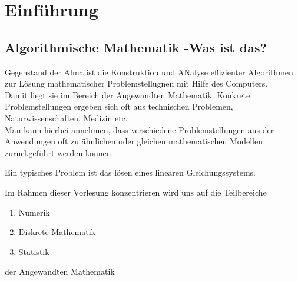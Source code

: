 \section{Einführung}
\subsection*{Algorithmische Mathematik -Was ist das?}
Gegenstand der Alma ist die Konstruktion und ANalyse effizienter Algorithmen zur Lösung mathematischer Problemstellugnen mit Hilfe des Computers. \\
Damit liegt sie im Bereich der Angewandten Mathematik. 
Konkrete Problemstellungen ergeben sich oft aus technischen Problemen, Naturwissenschaften, Medizin etc. \\
Man kann hierbei annehmen, dass verschiedene Problemstellungen aus der Anwendungen oft zu ähnlichen oder gleichen mathematischen Modellen zurückgeführt werden können. \\
\begin{example}
Ein typisches Problem ist das lösen eines linearen Gleichungssystems.
\end{example}
Im Rahmen dieser Vorlesung konzentrieren wird uns auf die Teilbereiche
\begin{enumerate}
	\item Numerik
	\item Diskrete Mathematik
	\item Statistik
\end{enumerate}
der Angewandten Mathematik
